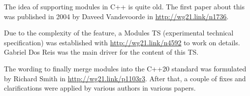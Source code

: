 The idea of supporting modules in C++ is quite old. The first paper about this was published in 2004 by Daveed Vandevoorde in \url{http://wg21.link/n1736}.

Due to the complexity of the feature, a Modules TS (experimental technical specification) was established with \url{http://wg21.link/n4592} to work on details. Gabriel Dos Reis was the main driver for the content of this TS.

The wording to finally merge modules into the C++20 standard was formulated by Richard Smith in \url{http://wg21.link/p1103r3}. After that, a couple of fixes and clarifications were applied by various authors in various papers.